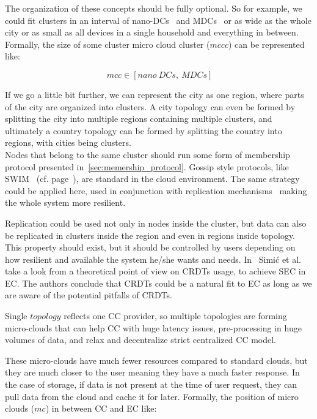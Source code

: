 The organization of these concepts should be fully optional. So for example, we could fit clusters in an interval of nano-DCs~\cite{inbookKurniawan} and MDCs~\cite{GreenbergHMP09} or as wide as the whole city or as small as all devices in a single household and everything in between. Formally, the size of some cluster micro cloud cluster ($mccc$) can be represented like:

\begin{equation}~\label{size:eq1}
	mcc \in \left[ nano\ DCs,\ MDCs \right]
\end{equation}

\noindent
If we go a little bit further, we can represent the city as one region, where parts of the city are organized into clusters. A city topology can even be formed by splitting the city into multiple regions containing multiple clusters, and ultimately a country topology can be formed by splitting the country into regions, with cities being clusters.\\

Nodes that belong to the same cluster should run some form of membership protocol presented in~\ref{sec:memership_protocol}. Gossip style protocols, like SWIM~\cite{DasGM02} (cf. page~\pageref{swim}), are standard in the cloud environment. The same strategy could be applied here, used in conjunction with replication mechanisms~\cite{LiBCL20, CauCBFCEB16, CRDTS_Nuno} making the whole system more resilient. 

Replication could be used not only in nodes inside the cluster, but data can also be replicated in clusters inside the region and even in regions inside topology. This property should exist, but it should be controlled by users depending on how resilient and available the system he/she wants and needs. In~\cite{inproceedingsSimic2} Simi\' c et al. take a look from a theoretical point of view on CRDTs usage, to achieve SEC in EC. The authors conclude that CRDTs could be a natural fit to EC as long as we are aware of the potential pitfalls of CRDTs.

Single $topology$ reflects one CC provider, so multiple topologies are forming micro-clouds that can help CC with huge latency issues, pre-processing in huge volumes of data, and relax and decentralize strict centralized CC model.

These micro-clouds have much fewer resources compared to standard clouds, but they are much closer to the user meaning they have a much faster response. In the case of storage, if data is not present at the time of user request, they can pull data from the cloud and cache it for later. Formally, the position of micro clouds ($mc$) in between CC and EC like:

